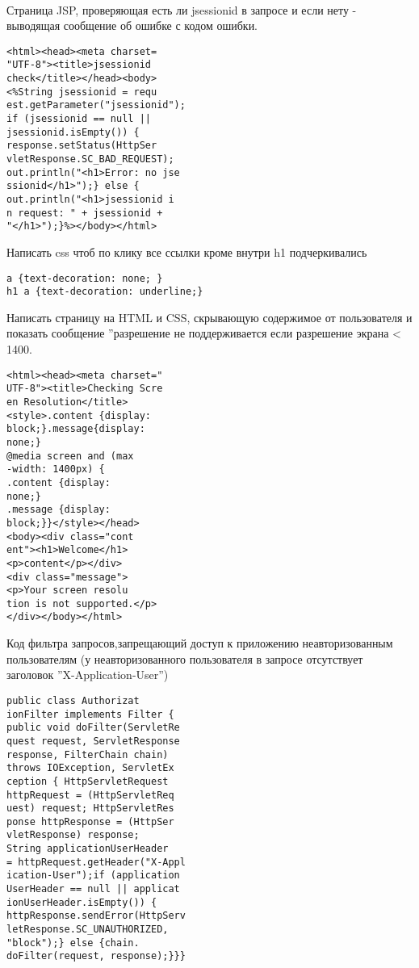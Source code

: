 \documentclass{article}
\begin{document}
\\
\begin{minipage}{.2\textwidth}
Страница JSP, проверяющая есть ли jsessionid в запросе и если нету - выводящая сообщение об ошибке с кодом ошибки.
\begin{lstlisting}
<html><head><meta charset=
"UTF-8"><title>jsessionid 
check</title></head><body>
<%String jsessionid = requ
est.getParameter("jsessionid");
if (jsessionid == null || 
jsessionid.isEmpty()) {
response.setStatus(HttpSer
vletResponse.SC_BAD_REQUEST);
out.println("<h1>Error: no jse
ssionid</h1>");} else {
out.println("<h1>jsessionid i
n request: " + jsessionid + 
"</h1>");}%></body></html>  
\end{lstlisting}
\end{minipage}
\hfill
\begin{minipage}{.2\textwidth}
Написать css чтоб по клику все ссылки кроме внутри h1 подчеркивались
\begin{lstlisting}
a {text-decoration: none; }
h1 a {text-decoration: underline;} 
\end{lstlisting}
\end{minipage}
\hfill
\begin{minipage}{.2\textwidth}
Написать страницу на HTML и CSS, скрывающую содержимое от пользователя и показать сообщение ”разрешение не поддерживается если разрешение экрана < 1400.
\begin{lstlisting}
<html><head><meta charset="
UTF-8"><title>Checking Scre
en Resolution</title>
<style>.content {display: 
block;}.message{display: 
none;}
@media screen and (max
-width: 1400px) {
.content {display: 
none;}
.message {display: 
block;}}</style></head>
<body><div class="cont
ent"><h1>Welcome</h1>
<p>content</p></div>
<div class="message">
<p>Your screen resolu
tion is not supported.</p>
</div></body></html> 
\end{lstlisting}
\end{minipage}
\hfill
\begin{minipage}{.2\textwidth}
Код фильтра запросов,запрещающий доступ к приложению неавторизованным пользователям (у неавторизованного пользователя в запросе отсутствует заголовок ”X-Application-User”)
\begin{lstlisting}
public class Authorizat
ionFilter implements Filter {
public void doFilter(ServletRe
quest request, ServletResponse 
response, FilterChain chain) 
throws IOException, ServletEx
ception { HttpServletRequest 
httpRequest = (HttpServletReq
uest) request; HttpServletRes
ponse httpResponse = (HttpSer
vletResponse) response;
String applicationUserHeader 
= httpRequest.getHeader("X-Appl
ication-User");if (application
UserHeader == null || applicat
ionUserHeader.isEmpty()) {
httpResponse.sendError(HttpServ
letResponse.SC_UNAUTHORIZED, 
"block");} else {chain.
doFilter(request, response);}}}
\end{lstlisting}
\end{minipage}
\end{document}

